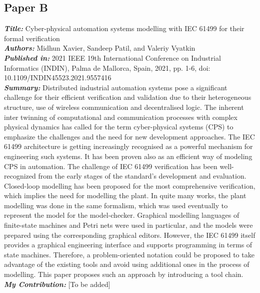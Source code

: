 \subsection{Paper B}
\textbf{\textit{Title:}} Cyber-physical automation systems modelling with IEC 61499 for their formal verification\\
\textbf{\textit{Authors:}} Midhun Xavier, Sandeep Patil, and Valeriy Vyatkin\\
\textbf{\textit{Published in:}} 2021 IEEE 19th International Conference on Industrial Informatics (INDIN), Palma de Mallorca, Spain, 2021, pp. 1-6, doi: 10.1109/INDIN45523.2021.9557416\\
\textbf{\textit{Summary:}} Distributed industrial automation systems pose a significant challenge for their efficient verification and validation due to their heterogeneous structure, use of wireless communication and decentralised logic. The inherent inter twinning of computational and communication processes with complex physical dynamics has called for the term cyber-physical systems (CPS) to emphasize the challenges and the need for new development approaches. The {IEC 61499} architecture is getting increasingly recognised as a powerful mechanism for engineering such systems. It has been proven also as an efficient way of modeling CPS in automation. The challenge of IEC 61499 verification has been well-recognized from the early stages of the standard's development and evaluation. Closed-loop modelling has been proposed for the most comprehensive verification, which implies the need for modelling the plant. In quite many works, the plant modelling was done in the same formalism, which was used eventually to represent the model for the model-checker. Graphical modelling languages of finite-state machines and Petri nets were used in particular, and the models were prepared using the corresponding graphical editors. However, the IEC 61499 itself provides a graphical engineering interface and supports programming in terms of state machines. Therefore, a problem-oriented notation could be proposed to take advantage of the existing tools and avoid using additional ones in the process of modelling. This paper proposes such an approach by introducing a tool chain.\\
\textbf{\textit{My Contribution:}} [To be added]

